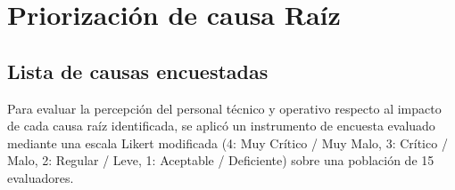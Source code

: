 \vspace{0.4em}

\section{Priorización de causa Raíz}
\subsection{Lista de causas encuestadas}
Para evaluar la percepción del personal técnico y operativo respecto al impacto de cada causa raíz identificada, se aplicó un instrumento de encuesta evaluado mediante una escala Likert modificada (4: Muy Crítico / Muy Malo, 3: Crítico / Malo, 2: Regular / Leve, 1: Aceptable / Deficiente) sobre una población de 15 evaluadores.

\begingroup
\footnotesize
\renewcommand{\arraystretch}{1.1}
